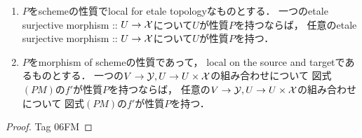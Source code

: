 \documentclass[a4paper, dvipdfmx]{jsarticle}
\begin{document}
    \begin{Lemma}
        \enumfix
        \begin{enumerate}[label=(\alph*)]
        \item
            $P$をschemeの性質でlocal for etale topologyなものとする．\mnewline
            一つのetale surjective morphism :: $U \to \mathcal{X}$について$U$が性質$P$を持つならば，\mnewline
            任意のetale surjective morphism :: $U \to \mathcal{X}$について$U$が性質$P$を持つ．
        \item
            $P$をmorphism of schemeの性質であって，
            local on the source and targetであるものとする．\mnewline
            一つの$V \to \mathcal{Y}, U \to U \times \mathcal{X}$の組み合わせについて
                図式$(PM)$の$f'$が性質$P$を持つならば，\mnewline
            任意の$V \to \mathcal{Y}, U \to U \times \mathcal{X}$の組み合わせについて
                図式$(PM)$の$f'$が性質$P$を持つ．
    \end{enumerate}
    \end{Lemma}
    \begin{proof}
        \cite{StacksProj} Tag 06FM
    \end{proof}
\end{document}

